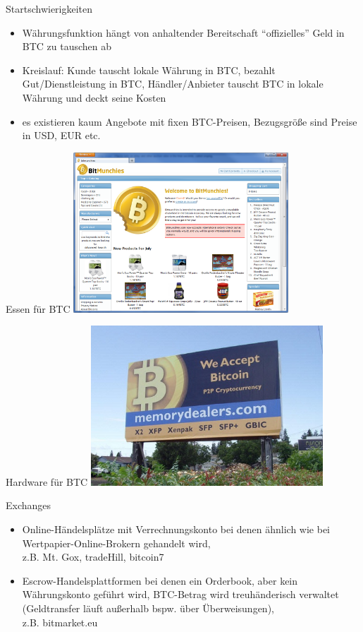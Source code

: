 \documentclass[handout]{beamer} \usepackage[german]{babel}
\begin{document}
\begin{frame}{Startschwierigkeiten}
	\begin{itemize}
		\item Währungsfunktion hängt von anhaltender Bereitschaft "`offizielles"'
			Geld in BTC zu tauschen ab
		\item Kreislauf: Kunde tauscht lokale Währung in BTC, bezahlt
			Gut/Dienstleistung in BTC, Händler/Anbieter tauscht BTC in lokale
			Währung und deckt seine Kosten
		\item es existieren kaum Angebote mit fixen BTC-Preisen, Bezugsgröße sind
			Preise in USD, EUR etc.
	\end{itemize}
\end{frame}

\begin{frame}{Essen für BTC}
	\includegraphics[height=60mm]{btcvortrag/Bitmunchies.png}
\end{frame}

\begin{frame}{Hardware für BTC}
	\includegraphics[height=60mm]{btcvortrag/bitcoin-billboard.jpg}
\end{frame}

\begin{frame}{Exchanges}
	\begin{itemize}
		\item Online-Händelsplätze mit Verrechnungskonto bei denen
			ähnlich wie bei Wertpapier-Online-Brokern gehandelt wird,\\
			z.B. Mt.  Gox, tradeHill, bitcoin7
		\item Escrow-Handelsplattformen bei denen ein Orderbook, aber kein
			Währungskonto geführt wird, BTC-Betrag
			wird treuhänderisch verwaltet
		(Geldtransfer läuft außerhalb bspw. über Überweisungen),\\
		 z.B. bitmarket.eu 
	\end{itemize}
\end{frame}
\end{document}

